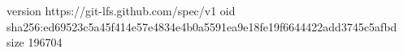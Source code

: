 version https://git-lfs.github.com/spec/v1
oid sha256:ed69523c5a45f414e57e4834e4b0a5591ea9e18fe19f6644422add3745c5afbd
size 196704
